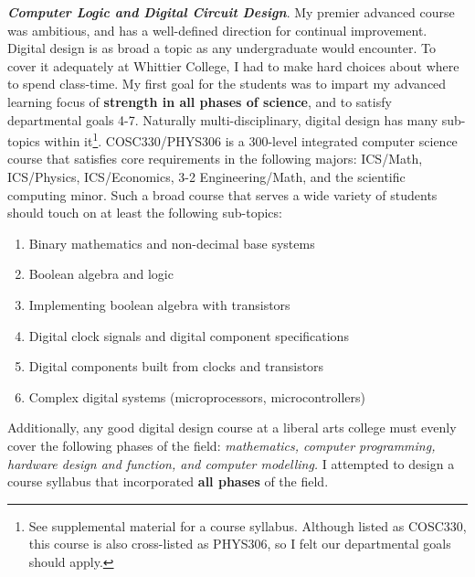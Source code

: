 \documentclass[../../../main.tex]{subfiles}
\begin{document}
\textbf{\textit{Computer Logic and Digital Circuit Design}}. My premier advanced course was ambitious, and has a well-defined direction for continual improvement.  Digital design is as broad a topic as any undergraduate would encounter.  To cover it adequately at Whittier College, I had to make hard choices about where to spend class-time. My first goal for the students was to impart my advanced learning focus of \textbf{strength in all phases of science}, and to satisfy departmental goals 4-7. Naturally multi-disciplinary, digital design has many sub-topics within it\footnote{See supplemental material for a course syllabus.  Although listed as COSC330, this course is also cross-listed as PHYS306, so I felt our departmental goals should apply.}.  COSC330/PHYS306 is a 300-level integrated computer science course that satisfies core requirements in the following majors: ICS/Math, ICS/Physics, ICS/Economics, 3-2 Engineering/Math, and the scientific computing minor.  Such a broad course that serves a wide variety of students should touch on at least the following sub-topics:

\begin{enumerate}
\item Binary mathematics and non-decimal base systems
\item Boolean algebra and logic
\item Implementing boolean algebra with transistors
\item Digital clock signals and digital component specifications
\item Digital components built from clocks and transistors
\item Complex digital systems (microprocessors, microcontrollers)
\end{enumerate}

Additionally, any good digital design course at a liberal arts college must evenly cover the following phases of the field: \textit{mathematics, computer programming, hardware design and function, and computer modelling.}  I attempted to design a course syllabus that incorporated \textbf{all phases} of the field. \\ \hspace{0.1cm}
\end{document}
